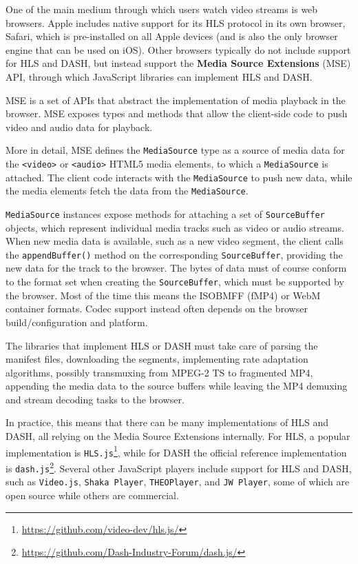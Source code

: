 One of the main medium through which users watch video streams is web browsers. Apple includes native support for its HLS protocol in its own browser, Safari, which is pre-installed on all Apple devices (and is also the only browser engine that can be used on iOS). Other browsers typically do not include support for HLS and DASH, but instead support the \textbf{Media Source Extensions} (MSE) API, through which JavaScript libraries can implement HLS and DASH.\cite{mse}

MSE is a set of APIs that abstract the implementation of media playback in the browser. MSE exposes types and methods that allow the client-side code to push video and audio data for playback.

More in detail, MSE defines the \texttt{MediaSource} type as a source of media data for the \texttt{<video>} or \texttt{<audio>} HTML5 media elements, to which a \texttt{MediaSource} is attached. The client code interacts with the \texttt{MediaSource} to push new data, while the media elements fetch the data from the \texttt{MediaSource}.

\texttt{MediaSource} instances expose methods for attaching a set of \texttt{SourceBuffer} objects, which represent individual media tracks such as video or audio streams. When new media data is available, such as a new video segment, the client calls the \texttt{appendBuffer()} method on the corresponding \texttt{SourceBuffer}, providing the new data for the track to the browser. The bytes of data must of course conform to the format set when creating the \texttt{SourceBuffer}, which must be supported by the browser. Most of the time this means the ISOBMFF (fMP4) or WebM container formats. Codec support instead often depends on the browser build/configuration and platform.

The libraries that implement HLS or DASH must take care of parsing the manifest files, downloading the segments, implementing rate adaptation algorithms, possibly transmuxing from MPEG-2 TS to fragmented MP4, appending the media data to the source buffers while leaving the MP4 demuxing and stream decoding tasks to the browser.

In practice, this means that there can be many implementations of HLS and DASH, all relying on the Media Source Extensions internally. For HLS, a popular implementation is \texttt{HLS.js}\footnote{\url{https://github.com/video-dev/hls.js/}}, while for DASH the official reference implementation is \texttt{dash.js}\footnote{\url{https://github.com/Dash-Industry-Forum/dash.js/}}. Several other JavaScript players include support for HLS and DASH, such as \texttt{Video.js}, \texttt{Shaka Player}, \texttt{THEOPlayer}, and \texttt{JW Player}, some of which are open source while others are commercial.

